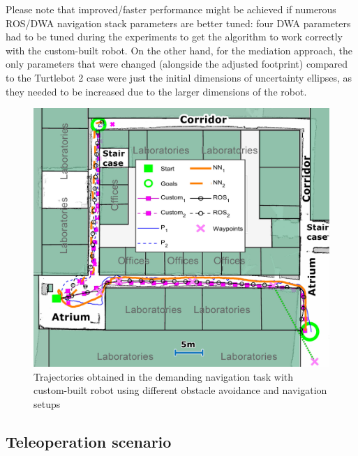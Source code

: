 Please note that improved/faster performance might be achieved if numerous ROS/DWA navigation stack parameters are better tuned: four DWA parameters had to be tuned during the experiments to get the algorithm to work correctly with the custom-built robot. On the other hand, for the mediation approach, the only parameters that were changed (alongside the adjusted footprint) compared to the Turtlebot 2 case were just the initial dimensions of uncertainty ellipses, as they needed to be increased due to the larger dimensions of the robot.

\begin{figure}
    \centering
    \includegraphics[width=0.85\columnwidth]{slike/res_hodnik2.jpg}
    \caption{Trajectories obtained in the demanding navigation task with custom-built robot using different obstacle avoidance and navigation setups}
    \label{Fig:Trajektorije_hodnik2}
\end{figure}

\subsection{Teleoperation scenario} \label{sec:MediationTeleopResults}

